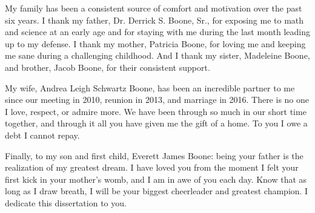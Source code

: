 \documentclass[12pt]{report}
\begin{document}
        My family has been a consistent source of comfort and motivation over the past six years. I thank my father, Dr. Derrick S. Boone, Sr., for exposing me to math and science at an early age and for staying with me during the last month leading up to my defense. I thank my mother, Patricia Boone, for loving me and keeping me sane during a challenging childhood. And I thank my sister, Madeleine Boone, and brother, Jacob Boone, for their consistent support.

        My wife, Andrea Leigh Schwartz Boone, has been an incredible partner to me since our meeting in 2010, reunion in 2013, and marriage in 2016. There is no one I love, respect, or admire more. We have been through so much in our short time together, and through it all you have given me the gift of a home. To you I owe a debt I cannot repay.

        Finally, to my son and first child, Everett James Boone: being your father is the realization of my greatest dream. I have loved you from the moment I felt your first kick in your mother's womb, and I am in awe of you each day. Know that as long as I draw breath, I will be your biggest cheerleader and greatest champion. I dedicate this dissertation to you.

    \afterpreface
 
 



















\end{document}
